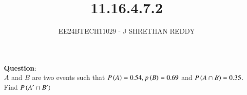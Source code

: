 \documentclass[journal]{IEEEtran}
\begin{document}

\vspace{3cm}

\title{11.16.4.7.2}
\author{EE24BTECH11029 - J SHRETHAN REDDY}
\maketitle
{\let\newpage\relax\maketitle}

\renewcommand{\thefigure}{\theenumi}
\renewcommand{\thetable}{\theenumi}
\setlength{\intextsep}{10pt} %


\renewcommand{\thetable}{\theenumi}
\textbf{Question}:\\
$A$ and $B$ are two events such that $P\left(A\right)=0.54,p\left(B\right)=0.69$ and $P\left(A \cap B\right)=0.35$. Find $P\left(A^\prime \cap B^\prime\right)$\\
\solution\\
\end{document}
